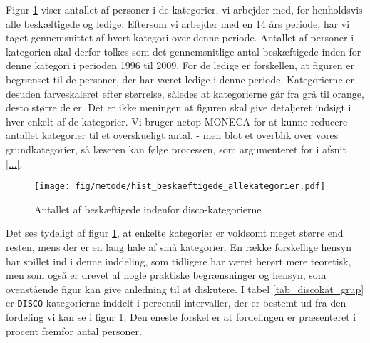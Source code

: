 Figur \ref{fig_hist_beskaeftigede_allekategorier} viser antallet af personer i de \antalkat kategorier, vi arbejder med, for henholdsvis alle beskæftigede og ledige. Eftersom vi arbejder med en 14 års periode, har vi taget gennemsnittet af hvert kategori over denne periode. Antallet af personer i kategorien skal derfor tolkes som det gennemsnitlige antal beskæftigede inden for denne kategori i perioden 1996 til 2009. For de ledige er forskellen, at figuren er begrænset til de personer, der har været ledige i denne periode. Kategorierne er desuden farveskaleret efter størrelse, således at kategorierne går fra grå til orange, desto større de er. Det er ikke meningen at figuren skal give detaljeret indsigt i hver enkelt af de \antalkat kategorier. Vi bruger netop MONECA for at kunne reducere antallet kategorier til et overskueligt antal. - men blot et overblik over vores grundkategorier, så læseren kan følge processen, som argumenteret for i afsnit \ref{...}. %
% 
\begin{figure}[h]
\begin{centering}
	\caption{Antallet af beskæftigede indenfor disco-kategorierne}
	\texttt{[image: fig/metode/hist\_beskaeftigede\_allekategorier.pdf]}
	\label{fig_hist_beskaeftigede_allekategorier}
\end{centering}
\end{figure}

Det ses tydeligt af figur \ref{fig_hist_beskaeftigede_allekategorier}, at enkelte kategorier er voldsomt meget større end resten, mens der er en lang hale af små kategorier. En række forskellige hensyn har spillet ind i denne inddeling, som tidligere har været berørt mere teoretisk, men som også er drevet af nogle praktiske begrænsninger og hensyn, som ovenstående figur kan give anledning til at diskutere. I tabel \ref{tab_discokat_grup} er \texttt{DISCO}-kategorierne inddelt i percentil-intervaller, der er bestemt ud fra den fordeling vi kan se i figur \ref{fig_hist_beskaeftigede_allekategorier}. Den eneste forskel er at fordelingen er præsenteret i procent fremfor antal personer. %

